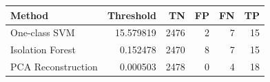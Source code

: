 \begin{tabular}{lrrrrr}
\toprule
Method & Threshold & TN & FP & FN & TP \\
\midrule
One-class SVM & 15.579819 & 2476 & 2 & 7 & 15 \\
Isolation Forest & 0.152478 & 2470 & 8 & 7 & 15 \\
PCA Reconstruction & 0.000503 & 2478 & 0 & 4 & 18 \\
\bottomrule
\end{tabular}
